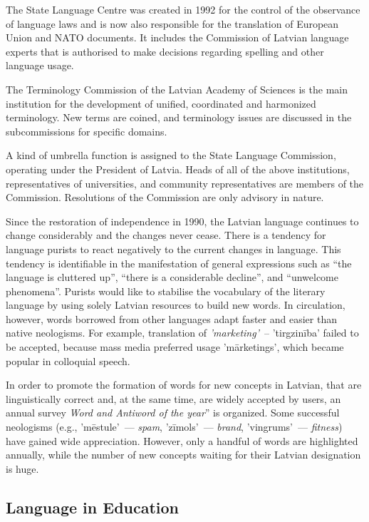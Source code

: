 \begin{multicols}{2}
The State Language Centre was created in 1992 for the control of the observance of language laws and is now also responsible for the translation of European Union and NATO documents.
It includes the Commission of Latvian language experts that is authorised to make decisions regarding spelling and other language usage.

The Terminology Commission of the Latvian Academy of Sciences is the main institution for the development of unified, coordinated and harmonized terminology.
New terms are coined, and terminology issues are discussed in the subcommissions for specific domains.

A kind of umbrella function is assigned to the State Language Commission, operating under the President of Latvia.
Heads of all of the above institutions, representatives of universities, and community representatives are members of the Commission.
Resolutions of the Commission are only advisory in nature.

Since the restoration of independence in 1990, the Latvian language continues to change considerably and the changes never cease.
There is a tendency for language purists to react negatively to the current changes in language.
This tendency is identifiable in the manifestation of general expressions such as ``the language is cluttered up'', ``there is a considerable decline'', and ``unwelcome phenomena''.
Purists would like to stabilise the vocabulary of the literary language by using solely Latvian resources to build new words.
In circulation, however, words borrowed from other languages adapt faster and easier than native neologisms.
For example, translation of \textit{'marketing'}~-- 'tirgzinība' failed to be accepted, because mass media preferred usage 'mārketings', which became popular in colloquial speech.

In order to promote the formation of words for new concepts in Latvian, that are linguistically correct and, at the same time, are widely accepted by users, an annual survey \textit{Word and Antiword of the year}'' is organized.
Some successful neologisms (e.g., 'mēstule'~--- \textit{spam}, 'zīmols'~--- \textit{brand}, 'vingrums'~--- \textit{fitness}) have gained wide appreciation.
However, only a handful of words are highlighted annually, while the number of new concepts waiting for their Latvian designation is huge.

\subsection{Language in Education}


\end{multicols}
